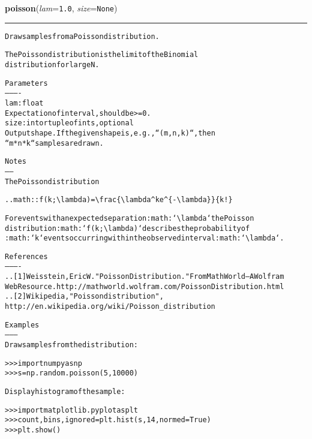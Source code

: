     \label{trunk:qstkutil:bollinger:poisson}

    \vspace{0.5ex}

\hspace{.8\funcindent}\begin{boxedminipage}{\funcwidth}

    \raggedright \textbf{poisson}(\textit{lam}={\tt 1.0}, \textit{size}={\tt None})

    \vspace{-1.5ex}

    \rule{\textwidth}{0.5\fboxrule}
\setlength{\parskip}{2ex}
\begin{alltt}
Draw samples from a Poisson distribution.

The Poisson distribution is the limit of the Binomial
distribution for large N.

Parameters
----------
lam : float
    Expectation of interval, should be {\textgreater}= 0.
size : int or tuple of ints, optional
    Output shape. If the given shape is, e.g., ``(m, n, k)``, then
    ``m * n * k`` samples are drawn.

Notes
-----
The Poisson distribution

.. math:: f(k; {\textbackslash}lambda)={\textbackslash}frac\{{\textbackslash}lambda{\textasciicircum}k e{\textasciicircum}\{-{\textbackslash}lambda\}\}\{k!\}

For events with an expected separation :math:`{\textbackslash}lambda` the Poisson
distribution :math:`f(k; {\textbackslash}lambda)` describes the probability of
:math:`k` events occurring within the observed interval :math:`{\textbackslash}lambda`.

References
----------
.. [1] Weisstein, Eric W. "Poisson Distribution." From MathWorld--A Wolfram
       Web Resource. http://mathworld.wolfram.com/PoissonDistribution.html
.. [2] Wikipedia, "Poisson distribution",
   http://en.wikipedia.org/wiki/Poisson\_distribution

Examples
--------
Draw samples from the distribution:

{\textgreater}{\textgreater}{\textgreater} import numpy as np
{\textgreater}{\textgreater}{\textgreater} s = np.random.poisson(5, 10000)

Display histogram of the sample:

{\textgreater}{\textgreater}{\textgreater} import matplotlib.pyplot as plt
{\textgreater}{\textgreater}{\textgreater} count, bins, ignored = plt.hist(s, 14, normed=True)
{\textgreater}{\textgreater}{\textgreater} plt.show()
\end{alltt}

\setlength{\parskip}{1ex}
    \end{boxedminipage}

